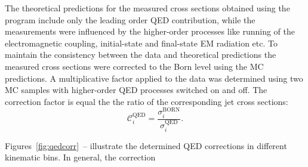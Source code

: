 The theoretical predictions for the measured cross sections obtained using the \nlojet program include only the leading order QED contribution, while the measurements were influenced by the higher-order processes like running of the electromagnetic coupling, initial-state and final-state EM radiation etc. To maintain the consistency between the data and theoretical predictions the measured cross sections were corrected to the Born level using the MC predictions. A multiplicative factor applied to the data was determined using two \lepto MC samples with higher-order QED processes switched on and off. The correction factor is equal the the ratio of the corresponding jet cross sections:
\begin{equation}
 \mathcal{C}^\text{QED}_i = \frac{\sigma_i^\text{BORN}}{\sigma_i^\text{QED}}.
 \label{eq:eqdcorr}
\end{equation}

Figures~\ref{fig:qedcorr}~-- illustrate the determined QED corrections in different kinematic bins. In general, the correction
 


